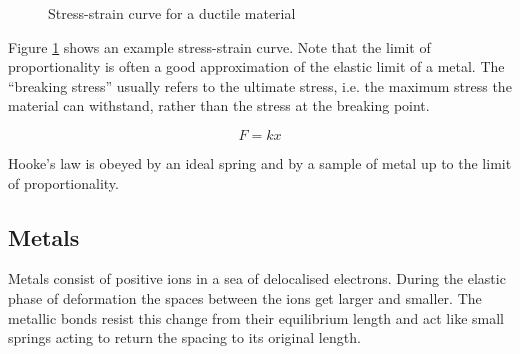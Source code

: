 \documentclass[revision-guide.tex]{subfiles}
\begin{document}
\begin{figure}[ht]
    \begin{center}
    \end{center}
    \caption{Stress-strain curve for a ductile material}
    \label{stress-strain}
\end{figure}

Figure \ref{stress-strain} shows an example stress-strain curve. Note that the limit of proportionality is often a good approximation of the elastic limit of a metal. The ``breaking stress'' usually refers to the ultimate stress, i.e. the maximum stress the material can withstand, rather than the stress at the breaking point.


\[ F = kx \]

Hooke's law is obeyed by an ideal spring and by a sample of metal up to the limit of proportionality.


\subsection{Metals}
Metals consist of positive ions in a sea of delocalised electrons. During the elastic phase of deformation the spaces between the ions get larger and smaller. The metallic bonds resist this change from their equilibrium length and act like small springs acting to return the spacing to its original length.
\end{document}

